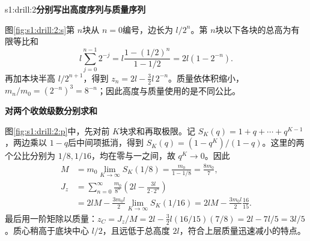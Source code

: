 \begin{drillsolution}{s1:drill:2}\textbf{分别写出高度序列与质量序列}\par\nobreak
图\ref{fig:s1:drill:2:s}第 $n$块从 $n=0$编号，边长为 $l/2^n$。第 $n$块以下各块的总高为有限等比和
\[
 l\sum_{j=0}^{n-1}2^{-j}
 =l\frac{1-(1/2)^n}{1-1/2}=2l(1-2^{-n}).
\]
再加本块半高 $l/2^{n+1}$，得到 $z_n=2l-\tfrac32l\,2^{-n}$。质量依体积缩小，$m_n/m_0=(2^{-n})^3=8^{-n}$；因此高度与质量使用的是不同公比。



\par\medskip{}\noindent\textbf{对两个收敛级数分别求和}\par\nobreak
图\ref{fig:s1:drill:2:p}中，先对前 $K$块求和再取极限。记 $S_K(q)=1+q+\cdots+q^{K-1}$，两边乘以 $1-q$后中间项抵消，得到 $S_K(q)=(1-q^K)/(1-q)$。这里的两个公比分别为 $1/8,1/16$，均在零与一之间，故 $q^K\to0$。因此
\begin{align*}
 M&=m_0\lim_{K\to\infty}S_K(1/8)
 =\frac{m_0}{1-1/8}=\frac{8m_0}{7},\\
 J_z&=\sum_{n=0}^\infty\frac{m_0}{8^n}
 \left(2l-\frac{3l}{2\cdot2^n}\right)\\
 &=2lM-\frac{3m_0l}{2}\lim_{K\to\infty}S_K(1/16)
 =2lM-\frac{3m_0l}{2}\frac{16}{15}.
\end{align*}
最后用一阶矩除以质量：$z_C=J_z/M=2l-\frac32l(16/15)(7/8)=2l-7l/5=3l/5$。质心稍高于底块中心 $l/2$，且远低于总高度 $2l$，符合上层质量迅速减小的特点。\end{drillsolution}
